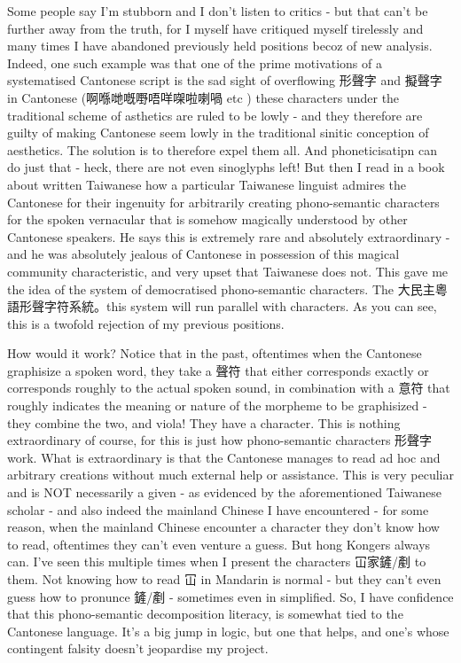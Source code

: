 Some people say I'm stubborn and I don't listen to critics - but that can't be further away from the truth, for I myself have critiqued myself tirelessly and many times I have abandoned previously held positions becoz of new analysis. Indeed, one such example was that one of the prime motivations of a systematised Cantonese script is the sad sight of overflowing 形聲字 and 擬聲字 in Cantonese (啊喺哋嘅嘢唔咩㗎啦喇喎 etc ) these characters under the traditional scheme of asthetics are ruled to be lowly - and they therefore are guilty of making Cantonese seem lowly in the traditional sinitic conception of aesthetics. The solution is to therefore expel them all. And phoneticisatipn can do just that - heck, there are not even sinoglyphs left! But then I read in a book about written Taiwanese how a particular Taiwanese linguist admires the Cantonese for their ingenuity for arbitrarily creating phono-semantic characters for the spoken vernacular that is somehow magically understood by other Cantonese speakers. He says this is extremely rare and absolutely extraordinary - and he was absolutely jealous of Cantonese in possession of this magical community characteristic, and very upset that Taiwanese does not. This gave me the idea of the system of democratised phono-semantic characters. The 大民主粵語形聲字符系統。this system will run parallel with characters. As you can see, this is a twofold rejection of my previous positions.


How would it work? Notice that in the past, oftentimes when the Cantonese graphisize a spoken word, they take a 聲符 that either corresponds exactly or corresponds roughly to the actual spoken sound, in combination with a 意符 that roughly indicates the meaning or nature of the morpheme to be graphisized - they combine the two, and viola! They have a character.          This is nothing extraordinary of course, for this is just how phono-semantic characters 形聲字 work. What is extraordinary is that the Cantonese manages to read ad hoc and arbitrary creations without much external help or assistance. This is very peculiar and is NOT necessarily a given - as evidenced by the aforementioned Taiwanese scholar - and also indeed the mainland Chinese I have encountered - for some reason, when the mainland Chinese encounter a character they don't know how to read, oftentimes they can't even venture a guess. But hong Kongers always can. I've seen this multiple times when I present the characters 冚家鏟/剷 to them. Not knowing how to read 冚 in Mandarin is normal - but they can't even guess how to pronunce 鏟/剷 - sometimes even in simplified. So, I have confidence that this phono-semantic decomposition literacy, is somewhat tied to the Cantonese language. It's a big jump in logic, but one that helps, and one's whose contingent falsity doesn't jeopardise my project.


